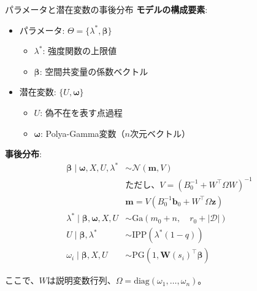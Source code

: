 \documentclass[xelatex, 8pt]{beamer}
\theoremstyle{plain}
\theoremstyle{definition}
\begin{document}
\begin{frame}{パラメータと潜在変数の事後分布}
    \textbf{モデルの構成要素}:
    \begin{itemize}
        \item パラメータ: $\Theta = \{\lambda^*, \boldsymbol{\beta}\}$
            \begin{itemize}
                \item $\lambda^*$: 強度関数の上限値
                \item $\boldsymbol{\beta}$: 空間共変量の係数ベクトル
            \end{itemize}
        \item 潜在変数: $\{U, \boldsymbol{\omega}\}$
            \begin{itemize}
                \item $U$: 偽不在を表す点過程
                \item $\boldsymbol{\omega}$: Polya-Gamma変数\cite{Polson2013}（$n$次元ベクトル）
            \end{itemize}
    \end{itemize}

    \vspace{3mm}
    \textbf{事後分布}:
    \begin{align*}
        \boldsymbol{\beta} \mid \boldsymbol{\omega}, X, U, \lambda^* &\sim \mathcal{N} \left( \boldsymbol{m}, V \right)\\
        &\text{ただし、} V = \left( B_0^{-1} + W^\top \Omega W \right)^{-1}\\
        &\boldsymbol{m} = V \left( B_0^{-1} \boldsymbol{b}_0 + W^\top \Omega \boldsymbol{z} \right)\\[2mm]
        \lambda^* \mid \boldsymbol{\beta}, \boldsymbol{\omega}, X, U &\sim \text{Ga}\left( m_0 + n, \quad r_0 + |\mathcal{D}| \right)\\[2mm]
        U \mid \boldsymbol{\beta}, \lambda^* &\sim \text{IPP}(\lambda^*(1-q))\\[2mm]
        \omega_i \mid \boldsymbol{\beta}, X, U &\sim \text{PG}(1, \boldsymbol{W}(s_i)^\top \boldsymbol{\beta})
    \end{align*}

    ここで、$W$は説明変数行列、$\Omega = \text{diag}(\omega_1, \ldots, \omega_n)$。
\end{frame}
\end{document}
